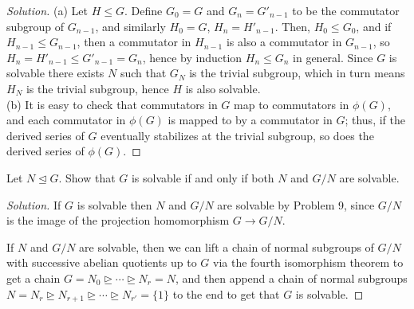 \documentclass[10pt]{article}
\newenvironment{soln}{\begin{proof}[Solution]}{\end{proof}}
\begin{document}
\begin{soln}
    (a) Let $H\le G$. Define $G_0 = G$ and $G_n = G'_{n-1}$
    to be the commutator subgroup of $G_{n-1}$,
    and similarly $H_0 = G$, $H_n = H'_{n-1}$.
    Then, $H_0\le G_0$, and if $H_{n-1}\le G_{n-1}$, then
    a commutator in $H_{n-1}$ is also a commutator in $G_{n-1}$,
    so $H_n = H'_{n-1}\le G'_{n-1} = G_n$, hence by induction
    $H_n\le G_n$ in general. Since $G$ is solvable
    there exists $N$ such that $G_N$ is the trivial subgroup,
    which in turn means $H_N$ is the trivial subgroup,
    hence $H$ is also solvable.
    \\

    (b) It is easy to check that commutators in $G$ map to
    commutators in $\phi(G)$, and each commutator in $\phi(G)$
    is mapped to by a commutator in $G$; thus, if the derived series of $G$
    eventually stabilizes at the trivial subgroup,
    so does the derived series of $\phi(G)$.
\end{soln}

\begin{problem}
    Let $N\trianglelefteq G$. Show that $G$ is solvable if and only if
    both $N$ and $G/N$ are solvable.
\end{problem}

\begin{soln}
    If $G$ is solvable then $N$ and $G/N$ are solvable
    by Problem 9, since $G/N$ is the image of the projection homomorphism $G\to G/N$.

    If $N$ and $G/N$ are solvable, then
    we can lift a chain of normal subgroups of $G/N$
    with successive abelian quotients up to $G$ via the fourth isomorphism theorem
    to get a chain $G = N_0\trianglerighteq\cdots\trianglerighteq N_r = N$,
    and then append a chain of normal subgroups
    $N = N_r \trianglerighteq N_{r+1}\trianglerighteq\cdots\trianglerighteq N_{r'}
    = \{1\}$ to the end to get that $G$ is solvable.
\end{soln}
\end{document}
